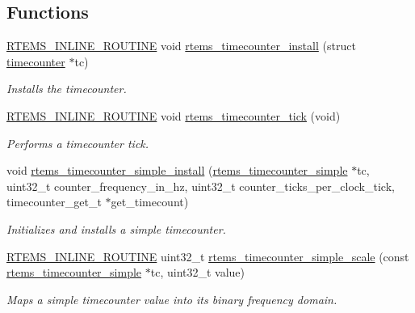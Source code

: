 \subsection*{Functions}
\begin{DoxyCompactItemize}
\item 
\mbox{\hyperlink{group__RTEMSScoreBaseDefs_gac216239df231d5dbd15e3520b0b9313f}{R\+T\+E\+M\+S\+\_\+\+I\+N\+L\+I\+N\+E\+\_\+\+R\+O\+U\+T\+I\+NE}} void \mbox{\hyperlink{group__SAPITimecounter_ga8ddad0a976e758ae165036b4399d1470}{rtems\+\_\+timecounter\+\_\+install}} (struct \mbox{\hyperlink{structtimecounter}{timecounter}} $\ast$tc)
\begin{DoxyCompactList}\small\item\em Installs the timecounter. \end{DoxyCompactList}\item 
\mbox{\hyperlink{group__RTEMSScoreBaseDefs_gac216239df231d5dbd15e3520b0b9313f}{R\+T\+E\+M\+S\+\_\+\+I\+N\+L\+I\+N\+E\+\_\+\+R\+O\+U\+T\+I\+NE}} void \mbox{\hyperlink{group__SAPITimecounter_ga05c046fc04548ac47c081919184d6a05}{rtems\+\_\+timecounter\+\_\+tick}} (void)
\begin{DoxyCompactList}\small\item\em Performs a timecounter tick. \end{DoxyCompactList}\item 
void \mbox{\hyperlink{group__SAPITimecounter_ga45a47eaf24d71281a0e78edfec01aaf6}{rtems\+\_\+timecounter\+\_\+simple\+\_\+install}} (\mbox{\hyperlink{structrtems__timecounter__simple}{rtems\+\_\+timecounter\+\_\+simple}} $\ast$tc, uint32\+\_\+t counter\+\_\+frequency\+\_\+in\+\_\+hz, uint32\+\_\+t counter\+\_\+ticks\+\_\+per\+\_\+clock\+\_\+tick, timecounter\+\_\+get\+\_\+t $\ast$get\+\_\+timecount)
\begin{DoxyCompactList}\small\item\em Initializes and installs a simple timecounter. \end{DoxyCompactList}\item 
\mbox{\hyperlink{group__RTEMSScoreBaseDefs_gac216239df231d5dbd15e3520b0b9313f}{R\+T\+E\+M\+S\+\_\+\+I\+N\+L\+I\+N\+E\+\_\+\+R\+O\+U\+T\+I\+NE}} uint32\+\_\+t \mbox{\hyperlink{group__SAPITimecounter_ga1b96b117973dd33c364e433d022048d9}{rtems\+\_\+timecounter\+\_\+simple\+\_\+scale}} (const \mbox{\hyperlink{structrtems__timecounter__simple}{rtems\+\_\+timecounter\+\_\+simple}} $\ast$tc, uint32\+\_\+t value)
\begin{DoxyCompactList}\small\item\em Maps a simple timecounter value into its binary frequency domain. \end{DoxyCompactList}\item 

\end{DoxyCompactItemize}
